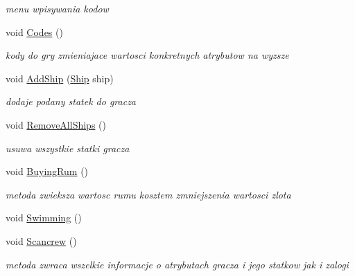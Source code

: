 \begin{DoxyCompactItemize}
\begin{DoxyCompactList}\small\item\em menu wpisywania kodow \end{DoxyCompactList}\item 
\mbox{\label{class_player_ac83f16a857e7af30ea9cb10d268f5e97}} 
void \hyperlink{class_player_ac83f16a857e7af30ea9cb10d268f5e97}{Codes} ()
\begin{DoxyCompactList}\small\item\em kody do gry zmieniajace wartosci konkretnych atrybutow na wyzsze \end{DoxyCompactList}\item 
\mbox{\label{class_player_a57f5ee759da818da979fec48084c1551}} 
void \hyperlink{class_player_a57f5ee759da818da979fec48084c1551}{Add\+Ship} (\hyperlink{class_ship}{Ship} ship)
\begin{DoxyCompactList}\small\item\em dodaje podany statek do gracza \end{DoxyCompactList}\item 
\mbox{\label{class_player_ae10e677107b02aba1e5e3626d3138abf}} 
void \hyperlink{class_player_ae10e677107b02aba1e5e3626d3138abf}{Remove\+All\+Ships} ()
\begin{DoxyCompactList}\small\item\em usuwa wszystkie statki gracza \end{DoxyCompactList}\item 
\mbox{\label{class_player_a9a02542fcb29f6facb130883cfb1bbed}} 
void \hyperlink{class_player_a9a02542fcb29f6facb130883cfb1bbed}{Buying\+Rum} ()
\begin{DoxyCompactList}\small\item\em metoda zwieksza wartosc rumu kosztem zmniejszenia wartosci zlota \end{DoxyCompactList}\item 
void \hyperlink{class_player_a254328ae8a844fcbc54fe6f159e02131}{Swimming} ()
\item 
\mbox{\label{class_player_aca8061cbd726027026078362a7864fc9}} 
void \hyperlink{class_player_aca8061cbd726027026078362a7864fc9}{Scancrew} ()
\begin{DoxyCompactList}\small\item\em metoda zwraca wszelkie informacje o atrybutach gracza i jego statkow jak i zalogi \end{DoxyCompactList}\item 

\end{DoxyCompactItemize}

